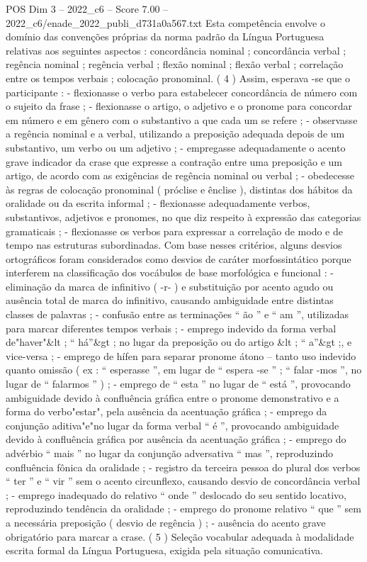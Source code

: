 \begin{textsample}{POS Dim 3 – 2022\_c6 – Score 7.00 – 2022\_c6/enade\_2022\_publi\_d731a0a567.txt}
Esta competência envolve o domínio das convenções próprias da norma padrão da Língua Portuguesa relativas aos seguintes aspectos : concordância nominal ; concordância verbal ; regência nominal ; regência verbal ; flexão nominal ; flexão verbal ; correlação entre os tempos verbais ; colocação pronominal. ( 4 ) Assim, esperava -se que o participante : - flexionasse o verbo para estabelecer concordância de número com o sujeito da frase ; - flexionasse o artigo, o adjetivo e o pronome para concordar em número e em gênero com o substantivo a que cada um se refere ; - observasse a regência nominal e a verbal, utilizando a preposição adequada depois de um substantivo, um verbo ou um adjetivo ; - empregasse adequadamente o acento grave indicador da crase que expresse a contração entre uma preposição e um artigo, de acordo com as exigências de regência nominal ou verbal ; - obedecesse às regras de colocação pronominal ( próclise e ênclise ), distintas dos hábitos da oralidade ou da escrita informal ; - flexionasse adequadamente verbos, substantivos, adjetivos e pronomes, no que diz respeito à expressão das categorias gramaticais ; - flexionasse os verbos para expressar a correlação de modo e de tempo nas estruturas subordinadas.
Com base nesses critérios, alguns desvios ortográficos foram considerados como desvios de caráter morfossintático porque interferem na classificação dos vocábulos de base morfológica e funcional : - eliminação da marca de infinitivo ( -r- ) e substituição por acento agudo ou ausência total de marca do infinitivo, causando ambiguidade entre distintas classes de palavras ; - confusão entre as terminações “ ão ” e “ am ”, utilizadas para marcar diferentes tempos verbais ; - emprego indevido da forma verbal de"haver"\&lt ; “ há”\&gt ; no lugar da preposição ou do artigo \&lt ; “ a”\&gt ;, e vice-versa ; - emprego de hífen para separar pronome átono – tanto uso indevido quanto omissão ( ex : “ esperasse ”, em lugar de “ espera -se ” ; “ falar -mos ”, no lugar de “ falarmos ” ) ; - emprego de “ esta ” no lugar de “ está ”, provocando ambiguidade devido à confluência gráfica entre o pronome demonstrativo e a forma do verbo"estar", pela ausência da acentuação gráfica ; - emprego da conjunção aditiva"e"no lugar da forma verbal “ é ”, provocando ambiguidade devido à confluência gráfica por ausência da acentuação gráfica ; - emprego do advérbio “ mais ” no lugar da conjunção adversativa “ mas ”, reproduzindo confluência fônica da oralidade ; - registro da terceira pessoa do plural dos verbos “ ter ” e “ vir ” sem o acento circunflexo, causando desvio de concordância verbal ; - emprego inadequado do relativo “ onde ” deslocado do seu sentido locativo, reproduzindo tendência da oralidade ; - emprego do pronome relativo “ que ” sem a necessária preposição ( desvio de regência ) ; - ausência do acento grave obrigatório para marcar a crase. ( 5 ) Seleção vocabular adequada à modalidade escrita formal da Língua Portuguesa, exigida pela situação comunicativa.

\end{textsample}
